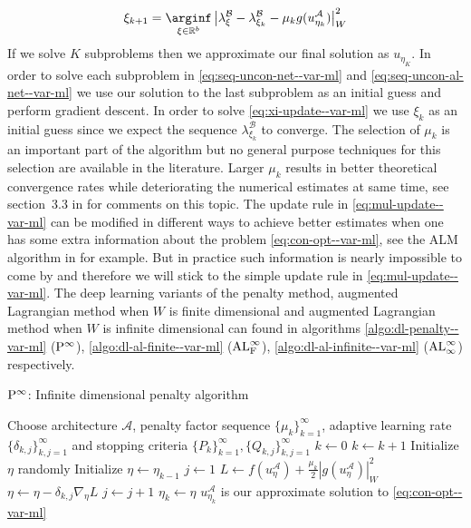 \begin{align}
    \xi_{k+1}=\underset{\xi\in\mathbb R^b}\arginf\left|\lambda_{\xi}^{\mathcal B}-\lambda_{\xi_{k}}^{\mathcal B}-\mu_k g(u_{\eta_k}^{\mathcal A})\right|_W^2\label{eq:xi-update--var-ml}
\end{align}
If we solve $K$ subproblems then we approximate our final solution as $u_{\eta_K}$. In order to solve each subproblem in \eqref{eq:seq-uncon-net--var-ml} and \eqref{eq:seq-uncon-al-net--var-ml} we use our solution to the last subproblem as an initial guess and perform gradient descent. In order to solve \eqref{eq:xi-update--var-ml} we use $\xi_k$ as an initial guess since we expect the sequence $\lambda_{\xi_k}^{\mathcal B}$ to converge. The selection of $\mu_k$ is an important part of the algorithm but no general purpose techniques for this selection are available in the literature. Larger $\mu_k$ results in better theoretical convergence rates while deteriorating the numerical estimates at same time, see section~3.3 in \cite{ito2008lagrange} for comments on this topic. The update rule in \eqref{eq:mul-update--var-ml} can be modified in different ways to achieve better estimates when one has some extra information about the problem \eqref{eq:con-opt--var-ml}, see the ALM algorithm in \cite{ito2008lagrange} for example. But in practice such information is nearly impossible to come by and therefore we will stick to the simple update rule in \eqref{eq:mul-update--var-ml}. The deep learning variants of the penalty method, augmented Lagrangian method when $W$ is finite dimensional and augmented Lagrangian method when $W$ is infinite dimensional can found in algorithms \ref{algo:dl-penalty--var-ml} (${\rm P}^\infty$), \ref{algo:dl-al-finite--var-ml} (${\rm AL}_{\rm F}^\infty$), \ref{algo:dl-al-infinite--var-ml} (${\rm AL}_\infty^\infty$) respectively. 

\begin{algorithm}[!ht]
\caption{${\rm P}^\infty$: Infinite dimensional penalty algorithm}
\label{algo:dl-penalty--var-ml}
\begin{algorithmic}[1]
    \STATE Choose architecture $\mathcal A$, penalty factor sequence $\{\mu_k\}_{k=1}^\infty$, adaptive learning rate $\{\delta_{k, j}\}_{k, j=1}^\infty$ and stopping criteria $\{P_k\}_{k=1}^\infty, \{Q_{k, j}\}_{k, j=1}^\infty$
    \STATE $k\leftarrow0$
        \STATE $k \leftarrow k+1$
                \STATE Initialize $\eta$ randomly
            \ELSE
                \STATE Initialize $\eta\leftarrow \eta_{k-1}$
        \ENDIF
        \STATE $j\leftarrow 1$
            \STATE $L\leftarrow f(u_{\eta}^{\mathcal A})+\frac{\mu_k}{2}|g(u_{\eta}^{\mathcal A})|^2_W$
            \STATE $\eta\leftarrow\eta-\delta_{k, j}\nabla_\eta L$
            \STATE $j\leftarrow j+1$
        \ENDWHILE
        \STATE $\eta_k\leftarrow\eta$
    \ENDWHILE
    \STATE $u_{\eta_k}^{\mathcal A}$ is our approximate solution to \eqref{eq:con-opt--var-ml}
\end{algorithmic}
\end{algorithm}

